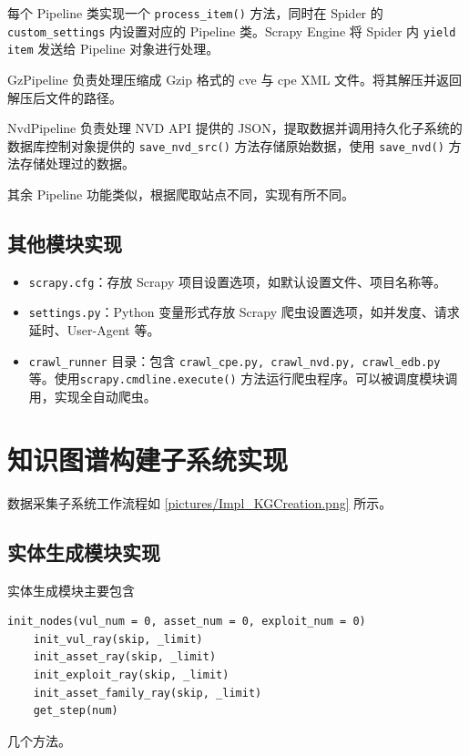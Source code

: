 \documentclass[a4paper,AutoFakeBold,oneside,12pt]{book}
\begin{document}
每个 Pipeline 类实现一个 \lstinline[style = python]|process_item()| 方法，同时在 Spider 的 \lstinline[style = python]|custom_settings| 内设置对应的 Pipeline 类。Scrapy Engine 将 Spider 内 \lstinline[style = python]|yield item| 发送给 Pipeline 对象进行处理。

GzPipeline 负责处理压缩成 Gzip 格式的 cve 与 cpe XML 文件。将其解压并返回解压后文件的路径。

NvdPipeline 负责处理 NVD API 提供的 JSON，提取数据并调用持久化子系统的数据库控制对象提供的 \lstinline|save_nvd_src()| 方法存储原始数据，使用 \lstinline|save_nvd()| 方法存储处理过的数据。

其余 Pipeline 功能类似，根据爬取站点不同，实现有所不同。

\subsection{其他模块实现}

\begin{itemize}
	\item \lstinline|scrapy.cfg|：存放 Scrapy 项目设置选项，如默认设置文件、项目名称等。
	\item \lstinline|settings.py|：Python 变量形式存放 Scrapy 爬虫设置选项，如并发度、请求延时、User-Agent 等。
	\item \lstinline|crawl_runner| 目录：包含 \lstinline|crawl_cpe.py, crawl_nvd.py, crawl_edb.py| 等。使用\linebreak \lstinline|scrapy.cmdline.execute()| 方法运行爬虫程序。可以被调度模块调用，实现全自动爬虫。
\end{itemize}

\section{知识图谱构建子系统实现\label{知识图谱构建子系统实现}}

数据采集子系统工作流程如 \ref{pictures/Impl_KGCreation.png} 所示。


\subsection{实体生成模块实现}

实体生成模块主要包含
\begin{lstlisting}[style=lgeneral]
	init_nodes(vul_num = 0, asset_num = 0, exploit_num = 0)
	init_vul_ray(skip, _limit)
	init_asset_ray(skip, _limit)
	init_exploit_ray(skip, _limit)
	init_asset_family_ray(skip, _limit)
	get_step(num)
\end{lstlisting}
几个方法。
\end{document}
